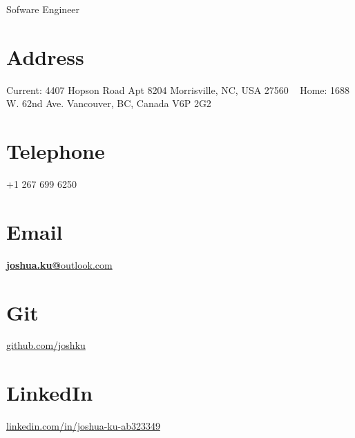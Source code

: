 \documentclass[]{friggeri-cv}
\begin{document}
      {Sofware Engineer}


\begin{aside}
  \section{Address}
    Current:
    4407 Hopson Road Apt 8204
    Morrisville, NC, USA 27560
    ~
    Home:
    1688 W. 62nd Ave.
    Vancouver, BC, Canada V6P 2G2
    ~
  \section{Telephone}
    +1 267 699 6250
    ~
  \section{Email}
    \href{mailto:joshua.ku@outlook.com}{\textbf{joshua.ku@}outlook.com}
    ~
  \section{Git}
    \href{https://github.com/joshku}{github.com/joshku}
    ~
  \section{LinkedIn}
    \href{https://www.linkedin.com/in/joshua-ku-ab323349/}{linkedin.com/in/joshua-ku-ab323349}
    ~

\end{aside}
\end{document}
